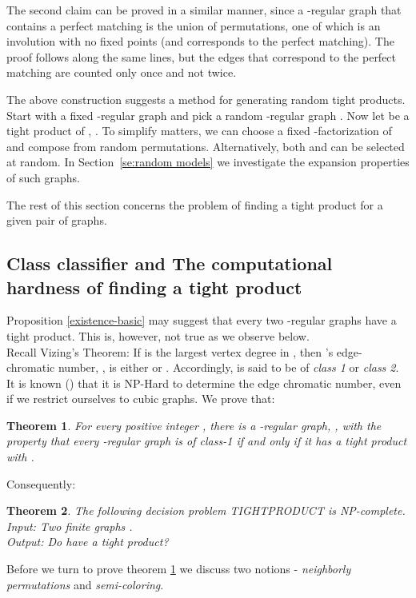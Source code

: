 \documentclass[12pt]{article}
\newtheorem{theorem}{Theorem}[section]
\newtheorem{open question}[theorem]{Open question}
\newcommand{\proofbox}{\begin{flushright}\end{flushright}}
\begin{document}
The second claim can be proved in a similar manner, since a -regular
graph that contains a perfect matching is the union of  permutations,
one of which is an involution with
no fixed points (and corresponds to the perfect matching). The proof follows along the same lines, but the edges that
correspond to the perfect matching are counted only once and not twice.
\proofbox

The above construction suggests a method for generating random
tight products. Start with a fixed -regular graph  and 
pick a random -regular graph . Now let  be a tight product of , . 
To simplify matters, we can choose a fixed -factorization of  and compose  from  random permutations.
Alternatively, both  and  can be selected at random. In Section~\ref{se:random models} we investigate
the expansion properties of such graphs.

The rest of this section concerns
the problem of finding a tight product for a given pair of graphs.

\subsection{Class classifier and The computational hardness of finding a tight product}\label{hardness}
Proposition \ref{existence-basic} may suggest that every two -regular graphs have a tight product. 
This is, however, not true as we observe below.\\
Recall Vizing's Theorem: If  is the
largest vertex degree in , then 's edge-chromatic number, , is either  or .
Accordingly,  is said to be of {\em class 1} or {\em class 2}.
It is known (\cite{Hol81}) that it is NP-Hard to determine the edge chromatic number, even if we restrict ourselves to cubic graphs. We prove that:
\begin{theorem}\label{theorem-class-classifier}
For every positive integer , there is a -regular graph, , with the property that every -regular graph  is of class-1 if and only if it has a tight product with . 
\end{theorem}
Consequently:
\begin{theorem}
The following decision problem TIGHTPRODUCT is NP-complete.\\
Input: Two finite graphs .\\
Output: Do  have a tight product?
\end{theorem}
Before we turn to prove theorem \ref{theorem-class-classifier} we discuss two notions - {\em neighborly permutations} and {\em semi-coloring}.
\end{document}
